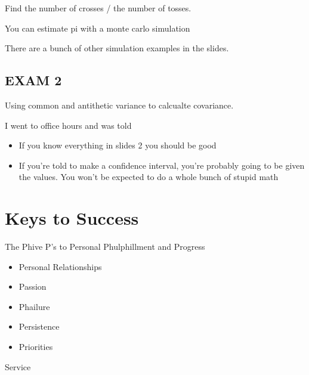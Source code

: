 \documentclass[fleqn]{report}
\begin{document}
Find the number of crosses / the number of tosses. 

You can estimate pi with a monte carlo simulation 

There are a bunch of other simulation examples in the slides. 

\section{EXAM 2}
Using common and antithetic variance to calcualte covariance. 

I went to office hours and was told 
\begin{itemize}
    \item 
    If you know everything in slides 2 you should be good 
    \item 
    If you're told to make a confidence interval, you're probably 
    going to be given the values. You won't be expected to do a whole 
    bunch of stupid math 
\end{itemize}

\chapter{Keys to Success}

The Phive P's to Personal Phulphillment and Progress 

\begin{itemize}
    \item 
    Personal Relationships 
    \item 
    Passion 
    \item 
    Phailure 
    \item 
    Persistence 
    \item 
    Priorities 
\end{itemize}

Service
\end{document}
